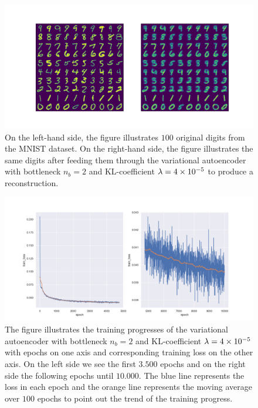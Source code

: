\begin{figure}
\begin{center}
      \includegraphics[trim = 15mm 10mm 15mm 15mm, clip, width=\linewidth]{convolutional_VAE_snd_KL_4e-5_10k_epochs_2D_inference}
\end{center}
\caption{On the left-hand side, the figure illustrates $100$ original digits from the MNIST dataset. On the right-hand side, the figure illustrates the same digits after feeding them through the variational autoencoder with bottleneck $n_b=2$ and KL-coefficient $\lambda = \num{4e-5}$ to produce a reconstruction.}\label{fig:convolutional_VAE_snd_KL_4e-5_10k_epochs_2D_inference}
\end{figure}


\begin{figure}
\begin{center}
\includegraphics[width=\linewidth]{convolutional_VAE_snd_KL_4e-5_10k_epochs_2D_training_progress}
\end{center}
\caption{The figure illustrates the training progresses of the variational autoencoder with bottleneck $n_b=2$ and KL-coefficient $\lambda = \num{4e-5}$ with epochs on one axis and corresponding training loss on the other axis. On the left side we see the first $3.500$ epochs and on the right side the following epochs until $10.000$. The blue line represents the loss in each epoch and the orange line represents the moving average over $100$ epochs to point out the trend of the training progress.}\label{fig:convolutional_VAE_snd_KL_4e-5_10k_epochs_2D_training_progress}
\end{figure}



